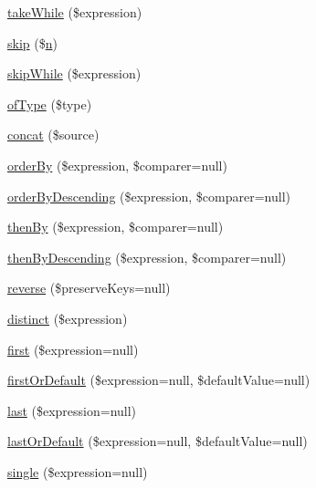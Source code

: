 \begin{DoxyCompactItemize}
\hyperlink{interface_p_h_p_linq___i_linq_provider_a1fc5c97541d4b8666dbc7fb9ea3717a7}{take\-While} (\$expression)
\item 
\hyperlink{interface_p_h_p_linq___i_linq_provider_af2536f10cfe7025b485561e1146e9cd0}{skip} (\$\hyperlink{add__cvs_8php_ab1b2829a7425bcec97d0ab4e6b3c77f2}{n})
\item 
\hyperlink{interface_p_h_p_linq___i_linq_provider_a24ee105087c3674aeebbe5ded87dd389}{skip\-While} (\$expression)
\item 
\hyperlink{interface_p_h_p_linq___i_linq_provider_a0a2ba7c0fc2611ebdb7af7827adac344}{of\-Type} (\$type)
\item 
\hyperlink{interface_p_h_p_linq___i_linq_provider_a3e57723b96efe016e8a95ff23bfbc82e}{concat} (\$source)
\item 
\hyperlink{interface_p_h_p_linq___i_linq_provider_a4da1bd83e986083bb8d34a401e8ebe2c}{order\-By} (\$expression, \$comparer=null)
\item 
\hyperlink{interface_p_h_p_linq___i_linq_provider_a76ee5b40b6c67d792788c1dc1da2f1cf}{order\-By\-Descending} (\$expression, \$comparer=null)
\item 
\hyperlink{interface_p_h_p_linq___i_linq_provider_a05857c194334417f951036f26570c348}{then\-By} (\$expression, \$comparer=null)
\item 
\hyperlink{interface_p_h_p_linq___i_linq_provider_ad98ee4890a9297e3bb1689e340a51597}{then\-By\-Descending} (\$expression, \$comparer=null)
\item 
\hyperlink{interface_p_h_p_linq___i_linq_provider_a8c53c55a81fa2256fd89655f945059aa}{reverse} (\$preserve\-Keys=null)
\item 
\hyperlink{interface_p_h_p_linq___i_linq_provider_ad88bb13ea1b971fd2a973334caa4668f}{distinct} (\$expression)
\item 
\hyperlink{interface_p_h_p_linq___i_linq_provider_a9c368dc77913f7cf4268bcaab18f848b}{first} (\$expression=null)
\item 
\hyperlink{interface_p_h_p_linq___i_linq_provider_a970d3424f925820d6d9f0b4e2b1aa52c}{first\-Or\-Default} (\$expression=null, \$default\-Value=null)
\item 
\hyperlink{interface_p_h_p_linq___i_linq_provider_a473a30c27001f1edc74b1b94f481c8d7}{last} (\$expression=null)
\item 
\hyperlink{interface_p_h_p_linq___i_linq_provider_a87a27c9a37068fdadedb4d026eba831a}{last\-Or\-Default} (\$expression=null, \$default\-Value=null)
\item 
\hyperlink{interface_p_h_p_linq___i_linq_provider_ab32beb141f7ae12ac580c8c1b0506390}{single} (\$expression=null)

\end{DoxyCompactItemize}

